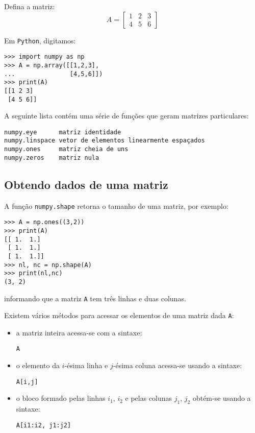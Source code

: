 \begin{ex}
  Defina a matriz:
  \begin{equation}
    A = \left[
      \begin{array}{ccc}
        1 & 2 & 3\\
        4 & 5 & 6
      \end{array}
\right]
  \end{equation}
\end{ex}
\begin{sol}
  Em \verb+Python+, digitamos:
\begin{verbatim}
>>> import numpy as np
>>> A = np.array([[1,2,3],
...               [4,5,6]])
>>> print(A)
[[1 2 3]
 [4 5 6]]
\end{verbatim}
\end{sol}

A seguinte lista contém uma série de funções que geram matrizes particulares:
\begin{verbatim}
numpy.eye      matriz identidade
numpy.linspace vetor de elementos linearmente espaçados
numpy.ones     matriz cheia de uns
numpy.zeros    matriz nula
\end{verbatim}

\subsection{Obtendo dados de uma matriz}

A função \verb+numpy.shape+ retorna o tamanho de uma matriz, por exemplo:
\begin{verbatim}
>>> A = np.ones((3,2))
>>> print(A)
[[ 1.  1.]
 [ 1.  1.]
 [ 1.  1.]]
>>> nl, nc = np.shape(A)
>>> print(nl,nc)
(3, 2)
\end{verbatim}
informando que a matriz \verb+A+ tem três linhas e duas colunas.

Existem vários métodos para acessar os elementos de uma matriz dada \verb+A+:
\begin{itemize}
\item a matriz inteira acessa-se com a sintaxe:
\begin{verbatim}
A
\end{verbatim}
\item o elemento da $i$-ésima linha e $j$-ésima coluna acessa-se usando a sintaxe:
\begin{verbatim}
A[i,j]
\end{verbatim}
\item o bloco formado pelas linhas $i_1$, $i_2$ e pelas colunas $j_1$, $j_2$ obtém-se usando a sintaxe:
\begin{verbatim}
A[i1:i2, j1:j2]
\end{verbatim}
\end{itemize}

